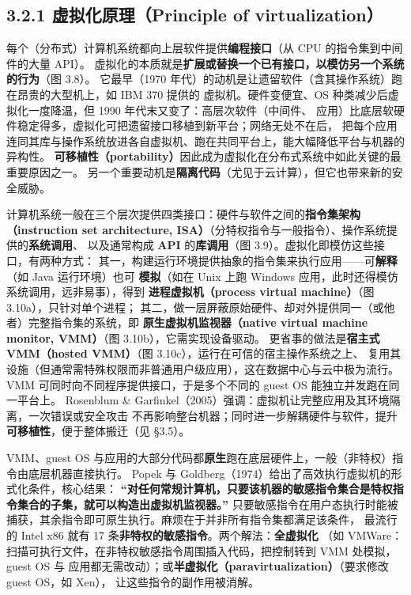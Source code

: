 \subsection*{3.2.1 虚拟化原理（Principle of virtualization）}
每个（分布式）计算机系统都向上层软件提供\textbf{编程接口}（从 CPU 的指令集到中间件的大量 API）。
虚拟化的本质就是\textbf{扩展或替换一个已有接口，以模仿另一个系统的行为}（图 3.8）。
它最早（1970 年代）的动机是让遗留软件（含其操作系统）跑在昂贵的大型机上，如 IBM 370 提供的
虚拟机。硬件变便宜、OS 种类减少后虚拟化一度降温，但 1990 年代末又变了：高层次软件（中间件、
应用）比底层软硬件稳定得多，虚拟化可把遗留接口移植到新平台；网络无处不在后，
把每个应用连同其库与操作系统放进各自虚拟机、跑在共同平台上，能大幅降低平台与机器的异构性。
\textbf{可移植性（portability）}因此成为虚拟化在分布式系统中如此关键的最重要原因之一。
另一个重要动机是\textbf{隔离代码}（尤见于云计算），但它也带来新的安全威胁。

\medskip\noindent 计算机系统一般在三个层次提供四类接口：硬件与软件之间的\textbf{指令集架构
（instruction set architecture, ISA）}（分特权指令与一般指令）、操作系统提供的\textbf{系统调用}、
以及通常构成 \textbf{API} 的\textbf{库调用}（图 3.9）。虚拟化即模仿这些接口，有两种方式：
其一，构建运行环境提供抽象的指令集来执行应用——可\textbf{解释}（如 Java 运行环境）也可
\textbf{模拟}（如在 Unix 上跑 Windows 应用，此时还得模仿系统调用，远非易事），得到
\textbf{进程虚拟机（process virtual machine）}（图 3.10a），只针对单个进程；
其二，做一层屏蔽原始硬件、却对外提供同一（或他者）完整指令集的系统，即
\textbf{原生虚拟机监视器（native virtual machine monitor, VMM）}（图 3.10b），它需实现设备驱动。
更省事的做法是\textbf{宿主式 VMM（hosted VMM）}（图 3.10c），运行在可信的宿主操作系统之上、
复用其设施（但通常需特殊权限而非普通用户级应用），这在数据中心与云中极为流行。
VMM 可同时向不同程序提供接口，于是多个不同的 guest OS 能独立并发跑在同一平台上。
Rosenblum \& Garfinkel（2005）强调：虚拟机让完整应用及其环境隔离，一次错误或安全攻击
不再影响整台机器；同时进一步解耦硬件与软件，提升\textbf{可移植性}，便于整体搬迁（见 §3.5）。

\begin{ideabox}
VMM、guest OS 与应用的大部分代码都\textbf{原生}跑在底层硬件上，一般（非特权）指令由底层机器直接执行。
Popek 与 Goldberg（1974）给出了高效执行虚拟机的形式化条件，核心结果：
\textbf{“对任何常规计算机，只要该机器的敏感指令集合是特权指令集合的子集，就可以构造出虚拟机监视器。”}
只要敏感指令在用户态执行时能被捕获，其余指令即可原生执行。麻烦在于并非所有指令集都满足该条件，
最流行的 Intel x86 就有 17 条\textbf{非特权的敏感指令}。两个解法：\textbf{全虚拟化}
（如 VMWare：扫描可执行文件，在非特权敏感指令周围插入代码，把控制转到 VMM 处模拟，guest OS 与
应用都无需改动）；或\textbf{半虚拟化（paravirtualization）}（要求修改 guest OS，如 Xen），
让这些指令的副作用被消解。
\end{ideabox}

